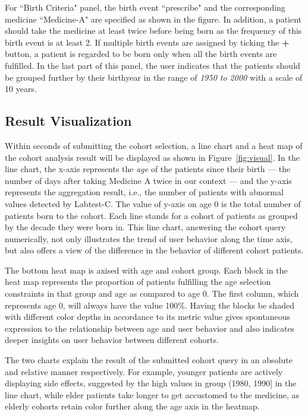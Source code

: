For ``Birth Criteria" panel, the birth event ``prescribe" and the corresponding medicine ``Medicine-A" are specified as shown in the figure.
In addition, a patient should take the medicine at least twice before being 
born as the frequency of this birth event is at least 2.
If multiple birth events are assigned by ticking the \textbf{+} button, a 
patient is regarded to be born only when all the birth events are fulfilled. 
In the last part of this panel, the user indicates that the patients should be grouped further by their birthyear in the range of \emph{1950 to 2000} with a scale of 10 years.

\subsection{Result Visualization}

Within seconds of submitting the cohort selection, a line chart and a heat map of the cohort analysis result will be displayed as shown in Figure~\ref{fig:visual}. In the line chart, the x-axis represents the \emph{age} of the patients since their {birth} --- the number of days after taking Medicine A twice in our context --- and the y-axis represents the aggregation result, i.e., the number of patients with abnormal values detected by Labtest-C. The value of y-axis on {age 0} is the total number of patients {born} to the cohort. 
Each line stands for a cohort of patients as grouped by the decade they were born in. 
This line chart, answering the cohort query numerically, not only illustrates the trend of user behavior along the time axis, but also offers a view of
the difference in the behavior of different cohort patients.

The bottom heat map is axised with {age} and cohort group. 
Each block in the heat map represents the proportion of patients fulfilling the age selection constraints in that group and {age} as compared to {age 0}. 
The first column, which represents {age 0}, will always have the value 100\%. 
Having the blocks be shaded with different color depths in accordance to its metric value gives spontaneous expression to the relationship between {age} and user behavior and also indicates deeper insights on user behavior between different cohorts. 

The two charts explain the result of the submitted cohort query in an absolute and relative manner respectively. For example, younger patients are actively displaying side effects, suggested by the high values in group (1980, 1990] in the line chart, while elder patients take longer to get accustomed to the medicine, as elderly cohorts retain color further along the age axis in the heatmap.

